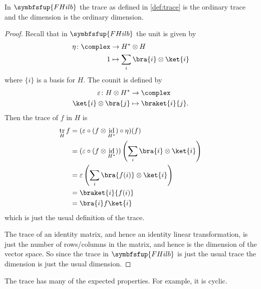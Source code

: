 \documentclass[fleqn]{NotesClass}
\makeatletter
\newcommand{\c@egory}[1]{\symbfsfup{#1}}
\newcommand{\FHilb}{\c@egory{FHilb}}
\DeclareMathOperator{\id}{id}
\DeclareMathOperator{\tr}{tr}
\makeatother
\begin{document}
    \begin{lma}{}{}
        In \(\FHilb\) the trace as defined in \cref{def:trace} is the ordinary trace and the dimension is the ordinary dimension.
        
        \begin{proof}
            Recall that in \(\FHilb\) the unit is given by
            \begin{align}
                \eta \colon \complex &\to H^* \otimes H\\
                1 &\mapsto \sum_i \bra{i} \otimes \ket{i}
            \end{align}
            where \(\{i\}\) is a basis for \(H\).
            The counit is defined by
            \begin{align}
                \varepsilon \colon H \otimes H^* &\to \complex\\
                \ket{i} \otimes \bra{j} &\mapsto \braket{i}{j}.
            \end{align}
            Then the trace of \(f\) in \(H\) is
            \begin{align}
                \tr_H f &= (\varepsilon \circ (f \otimes \id_{H^*}) \circ \eta)(f)\\
                &= (\varepsilon \circ (f \otimes \id_{H^*})) \left( \sum_i \bra{i} \otimes \ket{i} \right)\\
                &= \varepsilon\left( \sum_i \bra{f(i)} \otimes \ket{i} \right)\\
                &= \braket{i}{f(i)}\\
                &= \bra{i} f \ket{i}
            \end{align}
            which is just the usual definition of the trace.
            
            The trace of an identity matrix, and hence an identity linear transformation, is just the number of rows/columns in the matrix, and hence is the dimension of the vector space.
            So since the trace in \(\FHilb\) is just the usual trace the dimension is just the usual dimension.
        \end{proof}
    \end{lma}
    
    The trace has many of the expected properties.
    For example, it is cyclic.
    
\end{document}
